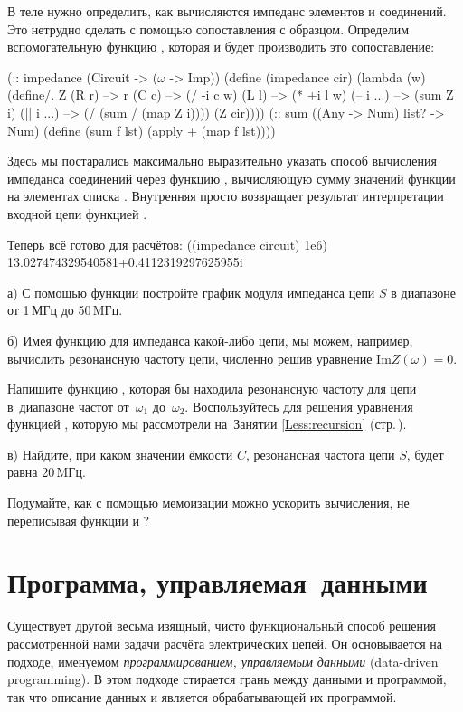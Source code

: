 В теле  нужно определить, как вычисляются импеданс элементов и соединений. Это нетрудно сделать с помощью сопоставления с образцом. Определим вспомогательную функцию , которая и будет производить это сопоставление:
\newpage
\begin{Definition}[emph={cir,w,f,lst,r,c,l,i}]
(:: impedance (Circuit -> ($\omega$ -> Imp))
 (define (impedance cir)
   (lambda (w) 
     (define/. Z
       (R r) --> r
       (C c) --> (/ -i c w)
       (L l) --> (* +i l w)
       (-- i ...) --> (sum Z i)
       (|| i ...) --> (/ (sum / (map Z i))))
     (Z cir))))%
(:: sum ((Any -> Num) list? -> Num)
  (define (sum f lst) 
    (apply + (map f lst))))
\end{Definition}
Здесь мы постарались максимально выразительно указать способ вычисления импеданса соединений через функцию , вычисляющую сумму значений функции  на элементах списка . Внутренняя   просто возвращает результат интерпретации входной цепи  функцией .

Теперь всё готово для расчётов:
\REPL
  {((impedance circuit) 1e6)}
  {13.027474329540581+0.4112319297625955i}

\begin{Assignment}
а) С помощью функции  постройте график модуля импеданса цепи $S$ в диапазоне от 1\,МГц до 50\,MГц.

б) Имея функцию для импеданса какой-либо цепи, мы можем, например, вычислить резонансную частоту цепи, численно решив уравнение $\mathrm{Im} Z(\omega) = 0$.

Напишите функцию , которая бы находила резонансную частоту для цепи  в~диапазоне частот от~$\omega_1$ до~$\omega_2$. Воспользуйтесь для решения уравнения функцией , которую мы рассмотрели на~Занятии \ref{Less:recursion}  (стр.\,\pageref{bisection}).

в) Найдите, при каком значении ёмкости $C$, резонансная частота цепи $S$, будет равна 20\,MГц. 

Подумайте, как с помощью мемоизации можно ускорить вычисления, не переписывая функции  и ?
\end{Assignment}

\section{Программа, \mbox{управляемая данными}}%
Существует другой весьма изящный, чисто функциональный способ решения рассмотренной нами задачи расчёта электрических цепей. Он основывается на подходе, именуемом \emph{программированием, управляемым данными} (data-driven programming). В этом подходе стирается грань между данными и программой, так что описание данных и является обрабатывающей их программой.

